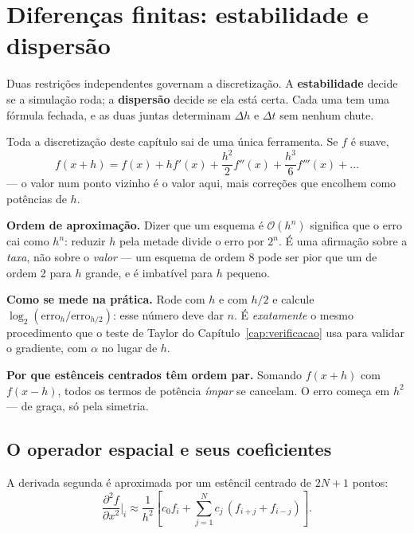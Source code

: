 \documentclass[11pt,a4paper,oneside]{report}
\begin{document}
\chapter{Diferen\c{c}as finitas: estabilidade e dispers\~ao}
\label{cap:numerico}

\begin{ideia}
Duas restri\c{c}\~oes independentes governam a discretiza\c{c}\~ao. A
\textbf{estabilidade} decide se a simula\c{c}\~ao roda; a \textbf{dispers\~ao}
decide se ela est\'a certa. Cada uma tem uma f\'ormula fechada, e as duas
juntas determinam $\Delta h$ e $\Delta t$ sem nenhum chute.
\end{ideia}

\begin{matematica}
Toda a discretiza\c{c}\~ao deste cap\'itulo sai de uma \'unica ferramenta. Se
$f$ \'e suave,
\[
f(x+h) = f(x) + h f'(x) + \frac{h^{2}}{2}f''(x) + \frac{h^{3}}{6}f'''(x)
 + \dots
\]
--- o valor num ponto vizinho \'e o valor aqui, mais corre\c{c}\~oes que
encolhem como pot\^encias de $h$.

\textbf{Ordem de aproxima\c{c}\~ao.} Dizer que um esquema \'e
$\mathcal{O}(h^{n})$ significa que o erro cai como $h^{n}$: reduzir $h$ pela
metade divide o erro por $2^{n}$. \'E uma afirma\c{c}\~ao sobre a
\emph{taxa}, n\~ao sobre o \emph{valor} --- um esquema de ordem 8 pode ser
pior que um de ordem 2 para $h$ grande, e \'e imbat\'ivel para $h$ pequeno.

\textbf{Como se mede na pr\'atica.} Rode com $h$ e com $h/2$ e calcule
$\log_2(\text{erro}_h/\text{erro}_{h/2})$: esse n\'umero deve dar $n$. \'E
\emph{exatamente} o mesmo procedimento que o teste de Taylor do
Cap\'itulo~\ref{cap:verificacao} usa para validar o gradiente, com $\alpha$
no lugar de $h$.

\textbf{Por que est\^enceis centrados t\^em ordem par.} Somando $f(x+h)$ com
$f(x-h)$, todos os termos de pot\^encia \emph{\'impar} se cancelam. O erro
come\c{c}a em $h^{2}$ --- de gra\c{c}a, s\'o pela simetria.
\end{matematica}

\section{O operador espacial e seus coeficientes}
\label{sec:taylor-fd}

A derivada segunda \'e aproximada por um est\^encil centrado de $2N+1$ pontos:
\begin{equation}
\frac{\partial^{2} f}{\partial x^{2}}\bigg|_{i} \approx
\frac{1}{h^{2}}\left[c_0 f_i + \sum_{j=1}^{N} c_j\,(f_{i+j} + f_{i-j})\right].
\label{eq:estencil}
\end{equation}
\end{document}

